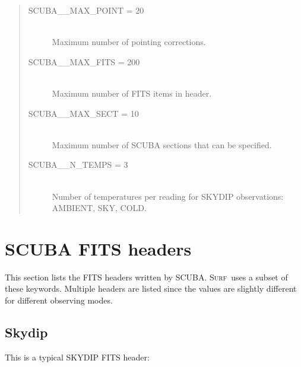 \documentclass[twoside,11pt,nolof]{starlink}
\providecommand{\scusoft}          {\textsc{Surf}}
\begin{document}
\begin{quote}
\begin{description}

  \item[SCUBA\_\_MAX\_POINT = 20] \mbox{} \\
   Maximum number of pointing corrections.
  \item[SCUBA\_\_MAX\_FITS = 200] \mbox{} \\
   Maximum number of FITS items in header.
  \item[SCUBA\_\_MAX\_SECT = 10] \mbox{} \\
   Maximum number of SCUBA sections that can be specified.
  \item[SCUBA\_\_N\_TEMPS = 3] \mbox{} \\
    Number of temperatures per reading for SKYDIP observations: AMBIENT, SKY,
COLD.

\end{description}
\end{quote}


\section{SCUBA FITS headers\label{app:fits}}

This section lists the FITS headers written by SCUBA. \scusoft\ uses a subset
of these keywords. Multiple headers are listed since the values are slightly
different for different observing modes.

\subsection{Skydip}

This is a typical SKYDIP FITS header:
\end{document}
